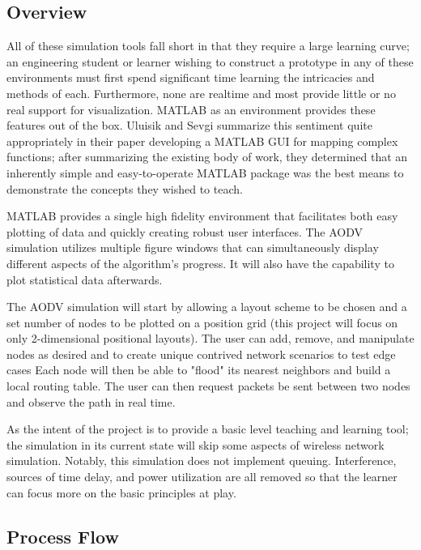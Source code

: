 \documentclass[conference]{IEEEtran}
\begin{document}
\subsection{Overview}

All of these simulation tools fall short in that they require a large learning curve; an engineering student or learner wishing to construct a prototype in any of these environments must first spend significant time learning the intricacies and methods of each. Furthermore, none are realtime and most provide little or no real support for visualization. MATLAB as an environment provides these features out of the box. Uluisik and Sevgi summarize this sentiment quite appropriately in their paper developing a MATLAB GUI for mapping complex functions\cite{matlab_gui}; after summarizing the existing body of work, they determined that an inherently simple and easy-to-operate MATLAB package was the best means to demonstrate the concepts they wished to teach. 

MATLAB provides a single high fidelity environment that facilitates both easy plotting of data and quickly creating robust user interfaces. The AODV simulation utilizes multiple figure windows that can simultaneously display different aspects of the algorithm's progress. It will also have the capability to plot statistical data afterwards.

The AODV simulation will start by allowing a layout scheme to be chosen and a set number of nodes to be plotted on a position grid (this project will focus on only 2-dimensional positional layouts). The user can add, remove, and manipulate nodes as desired and to create unique contrived network scenarios to test edge cases Each node will then be able to "flood" its nearest neighbors and build a local routing table. The user can then request packets be sent between two nodes and observe the path in real time.

As the intent of the project is to provide a basic level teaching and learning tool; the simulation in its current state will skip some aspects of wireless network simulation. Notably, this simulation does not implement queuing. Interference, sources of time delay, and power utilization are all removed so that the learner can focus more on the basic principles at play.

\subsection{Process Flow}
\end{document}
